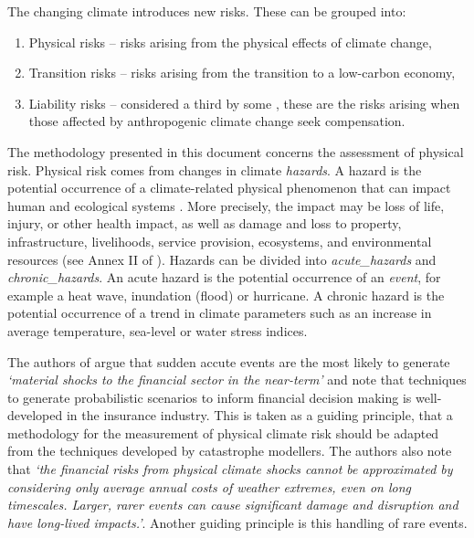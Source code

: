 \documentclass[a4paper,11pt]{extarticle} %
\theoremstyle{definition}
\begin{document}
The changing climate introduces new risks. These can be grouped into:
\begin{enumerate}
    \item Physical risks -- risks arising from the physical effects of climate change,
    \item Transition risks -- risks arising from the transition to a low-carbon economy,
    \item Liability risks -- considered a third by some \cite{WoetzelEtAl:2020}, these are the risks arising when those affected by anthropogenic climate change seek compensation.
\end{enumerate}

The methodology presented in this document concerns the assessment of physical risk. Physical risk comes from changes in climate \emph{\gls{hazard}s}. A hazard is the potential occurrence of a climate-related physical phenomenon that can impact human and ecological systems \cite{ReisingerEtAl:2020,WoetzelEtAl:2020,MitchellEtAl:2017}. More precisely, the impact may be loss of life, injury, or other
health impact, as well as damage and loss to property, infrastructure,
livelihoods, service provision, ecosystems, and environmental resources (see Annex II of \cite{PortnerEtAl:2022}). Hazards can be divided into \emph{\gls{acute_hazard}s} and \emph{\gls{chronic_hazard}s}. An acute hazard is the potential occurrence of an \emph{event}, for example a heat wave, inundation (flood) or hurricane. A chronic hazard is the potential occurrence of a trend in climate parameters such as an increase in average temperature, sea-level or water stress indices.

The authors of \cite{RangerEtAl:2022} argue that sudden accute events are the most likely to generate \emph{`material shocks to the financial sector in the near-term'} and note that techniques to generate probabilistic scenarios to inform financial decision making is well-developed in the insurance industry. This is taken as a guiding principle, that a methodology for the measurement of physical climate risk should be adapted from the techniques developed by catastrophe modellers. The authors also note that \emph{`the financial risks from physical climate shocks cannot be approximated by considering only average annual costs of weather extremes, even on long timescales. Larger, rarer events can cause significant damage and disruption and have long-lived impacts.'}. Another guiding principle is this handling of rare events.
\end{document}
